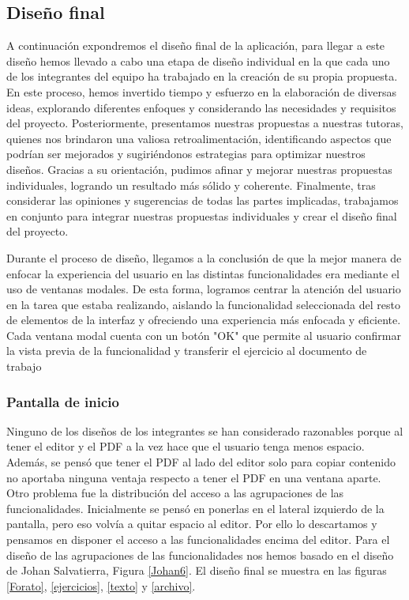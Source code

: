 \subsection{Diseño final}\label{subsec:DisenyoFinal}
A continuación expondremos el diseño final de la aplicación, para llegar a este diseño hemos llevado a cabo una etapa de diseño individual en la que cada uno de los integrantes del equipo ha trabajado en la creación de su propia propuesta. En este proceso, hemos invertido tiempo y esfuerzo en la elaboración de diversas ideas, explorando diferentes enfoques y considerando las necesidades y requisitos del proyecto. Posteriormente, presentamos nuestras propuestas a nuestras tutoras, quienes nos brindaron una valiosa retroalimentación, identificando aspectos que podrían ser mejorados y sugiriéndonos estrategias para optimizar nuestros diseños. Gracias a su orientación, pudimos afinar y mejorar nuestras propuestas individuales, logrando un resultado más sólido y coherente. Finalmente, tras considerar las opiniones y sugerencias de todas las partes implicadas, trabajamos en conjunto para integrar nuestras propuestas individuales y crear el diseño final del proyecto.

Durante el proceso de diseño, llegamos a la conclusión de que la mejor manera de enfocar la experiencia del usuario en las distintas funcionalidades era mediante el uso de ventanas modales. De esta forma, logramos centrar la atención del usuario en la tarea que estaba realizando, aislando la funcionalidad seleccionada del resto de elementos de la interfaz y ofreciendo una experiencia más enfocada y eficiente. Cada ventana modal cuenta con un botón "OK" que permite al usuario confirmar la vista previa de la funcionalidad y transferir el ejercicio al documento de trabajo

\subsubsection{Pantalla de inicio}
Ninguno de los diseños de los integrantes se han considerado razonables porque al tener el editor y el PDF a la vez hace que el usuario tenga menos espacio. Además, se pensó que tener el PDF al lado del editor solo para copiar contenido no aportaba ninguna ventaja respecto a tener el PDF en una ventana aparte. Otro problema fue la distribución del acceso a las agrupaciones de las funcionalidades. Inicialmente se pensó en ponerlas en el lateral izquierdo de la pantalla, pero eso volvía a quitar espacio al editor. Por ello lo descartamos y pensamos en disponer el acceso a las funcionalidades encima del editor. Para el diseño de las agrupaciones de las funcionalidades nos hemos basado en el diseño de Johan Salvatierra, Figura \ref{Johan6}. El diseño final se  muestra en las figuras \ref{Forato}, \ref{ejercicios}, \ref{texto} y \ref{archivo}.

